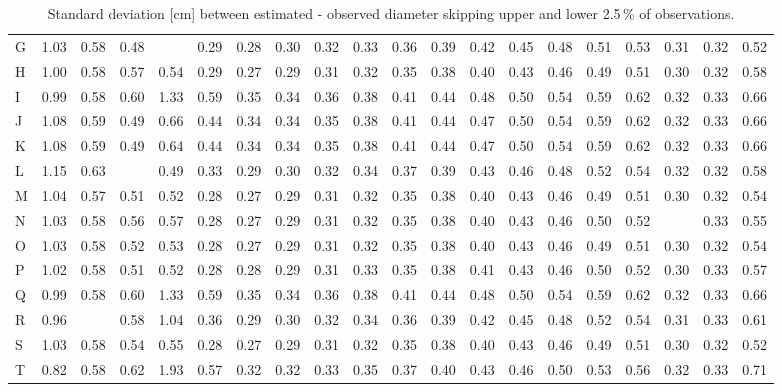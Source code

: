 \documentclass[twocolumn]{scrartcl}
\begin{document}
\begin{table*}[htbp]
\begin{adjustbox}{width=1.95\columnwidth}
\begin{tabular*}{\linewidth}{l |@{~~~} *{19}{S[detect-weight,mode=text,table-format=1.2]}}
G & 1.03 & 0.58 & 0.48 &  & 0.29 & 0.28 & 0.30 & 0.32 & 0.33 & 0.36 & 0.39 & 0.42 & 0.45 & 0.48 & 0.51 & 0.53 & 0.31 & 0.32 & 0.52 \\
H & 1.00 & 0.58 & 0.57 & 0.54 & 0.29 & 0.27 & 0.29 & 0.31 & 0.32 & 0.35 & 0.38 & 0.40 & 0.43 & 0.46 & 0.49 & 0.51 & 0.30 & 0.32 & 0.58 \\
I & 0.99 & 0.58 & 0.60 & 1.33 & 0.59 & 0.35 & 0.34 & 0.36 & 0.38 & 0.41 & 0.44 & 0.48 & 0.50 & 0.54 & 0.59 & 0.62 & 0.32 & 0.33 & 0.66 \\
J & 1.08 & 0.59 & 0.49 & 0.66 & 0.44 & 0.34 & 0.34 & 0.35 & 0.38 & 0.41 & 0.44 & 0.47 & 0.50 & 0.54 & 0.59 & 0.62 & 0.32 & 0.33 & 0.66 \\[.35em]
K & 1.08 & 0.59 & 0.49 & 0.64 & 0.44 & 0.34 & 0.34 & 0.35 & 0.38 & 0.41 & 0.44 & 0.47 & 0.50 & 0.54 & 0.59 & 0.62 & 0.32 & 0.33 & 0.66 \\
L & 1.15 & 0.63 &  & 0.49 & 0.33 & 0.29 & 0.30 & 0.32 & 0.34 & 0.37 & 0.39 & 0.43 & 0.46 & 0.48 & 0.52 & 0.54 & 0.32 & 0.32 & 0.58 \\
M & 1.04 & 0.57 & 0.51 & 0.52 & 0.28 & 0.27 & 0.29 & 0.31 & 0.32 & 0.35 & 0.38 & 0.40 & 0.43 & 0.46 & 0.49 & 0.51 & 0.30 & 0.32 & 0.54 \\
N & 1.03 & 0.58 & 0.56 & 0.57 & 0.28 & 0.27 & 0.29 & 0.31 & 0.32 & 0.35 & 0.38 & 0.40 & 0.43 & 0.46 & 0.50 & 0.52 &  & 0.33 & 0.55 \\
O & 1.03 & 0.58 & 0.52 & 0.53 & 0.28 & 0.27 & 0.29 & 0.31 & 0.32 & 0.35 & 0.38 & 0.40 & 0.43 & 0.46 & 0.49 & 0.51 & 0.30 & 0.32 & 0.54 \\[.35em]
P & 1.02 & 0.58 & 0.51 & 0.52 & 0.28 & 0.28 & 0.29 & 0.31 & 0.33 & 0.35 & 0.38 & 0.41 & 0.43 & 0.46 & 0.50 & 0.52 & 0.30 & 0.33 & 0.57 \\
Q & 0.99 & 0.58 & 0.60 & 1.33 & 0.59 & 0.35 & 0.34 & 0.36 & 0.38 & 0.41 & 0.44 & 0.48 & 0.50 & 0.54 & 0.59 & 0.62 & 0.32 & 0.33 & 0.66 \\
R & 0.96 &  & 0.58 & 1.04 & 0.36 & 0.29 & 0.30 & 0.32 & 0.34 & 0.36 & 0.39 & 0.42 & 0.45 & 0.48 & 0.52 & 0.54 & 0.31 & 0.33 & 0.61 \\
S & 1.03 & 0.58 & 0.54 & 0.55 & 0.28 & 0.27 & 0.29 & 0.31 & 0.32 & 0.35 & 0.38 & 0.40 & 0.43 & 0.46 & 0.49 & 0.51 & 0.30 & 0.32 & 0.52 \\
T & 0.82 & 0.58 & 0.62 & 1.93 & 0.57 & 0.32 & 0.32 & 0.33 & 0.35 & 0.37 & 0.40 & 0.43 & 0.46 & 0.50 & 0.53 & 0.56 & 0.32 & 0.33 & 0.71
\end{tabular*}
\end{adjustbox}
\caption{Standard deviation [cm] between estimated - observed diameter skipping upper and lower 2.5\,\% of observations.}
\label{tab:stdDifInterpol}
\end{table*}
\end{document}
